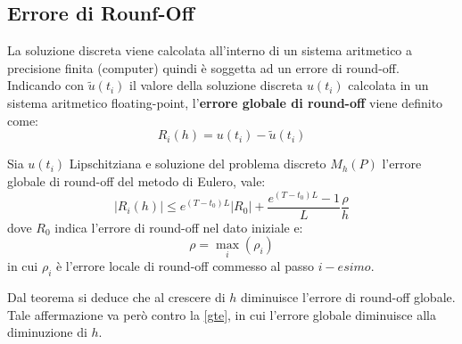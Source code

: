 \subsection{Errore di Rounf-Off}
La soluzione discreta viene calcolata all'interno di un sistema aritmetico a precisione finita (computer) quindi è soggetta ad un errore di round-off.
\\Indicando con $\tilde{u}(t_i)$ il valore della soluzione discreta $u(t_i)$ calcolata in un sistema aritmetico floating-point, l'\textbf{errore globale di round-off} viene definito come:
\begin{equation}
	R_i(h) = u(t_i) - \tilde{u}(t_i)
\end{equation}
\begin{theorem}
	Sia $u(t_i)$ Lipschitziana e soluzione del problema discreto $M_h(P)$ l'errore globale di round-off del metodo di Eulero, vale:
	\begin{equation}
		\label{roundoff}
		|R_i(h)| \leq e^{(T-t_0)L}|R_0| + \dfrac{e^{(T-t_0)L}-1}{L}\dfrac{\rho}{h} 
	\end{equation}
dove $R_0$ indica l'errore di round-off nel dato iniziale e:
\[
	\rho = \max_{i}(\rho_i)
\]
in cui $\rho_i$ è l'errore locale di round-off commesso al passo $i-esimo$.
\end{theorem}
Dal teorema si deduce che al crescere di $h$ diminuisce l'errore di round-off globale.
\\Tale affermazione va però contro la \ref{gte}, in cui l'errore globale diminuisce alla diminuzione di $h$.

